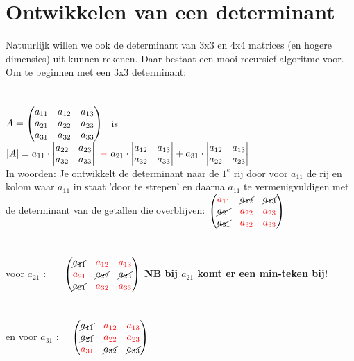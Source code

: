 \section{Ontwikkelen van een determinant}
Natuurlijk willen we ook de determinant van 3x3 en 4x4 matrices (en hogere dimensies) uit kunnen rekenen. Daar bestaat een mooi recursief algoritme voor. Om te beginnen met een 3x3 determinant:\\ \\ \\
{ $  A  = \begin{pmatrix}  a_{11} & a_{12} & a_{13}  \\  a_{21} & a_{22} & a_{23}  \\  a_{31} & a_{32}& a_{33}  \end{pmatrix}  $
	\  is \  
	$ |A|  = a_{11} \cdot   \begin{vmatrix} a_{22} & a_{23} \\ a_{32}& a_{33}  \end{vmatrix} 
	\  {\color{red}-} \ a_{21} \cdot    \begin{vmatrix} a_{12} & a_{13} \\ a_{32}& a_{33}  \end{vmatrix} 
	+a_{31} \cdot    \begin{vmatrix} a_{12} & a_{13} \\  a_{22} & a_{23}  \end{vmatrix}  $ } \\
In woorden: Je ontwikkelt de determinant naar de $ 1^{e} $ rij door voor $  a_{11} $ de rij en kolom waar $  a_{11} $ in staat 'door te strepen' en daarna $  a_{11}  $ te vermenigvuldigen met de determinant van de getallen die overblijven:
$  \begin{pmatrix}   {\color{red}a_{11}} & \cancel{a_{12}} & \cancel{a_{13} }  \\  \cancel{a_{21}} & {\color{red}a_{22}} & {\color{red}a_{23}}  \\  \cancel{a_{31}} & {\color{red}a_{32}} & {\color{red}a_{33}}  \end{pmatrix}  $ \\ \\ \\
voor  $  a_{21}  $ :
\qquad \qquad \quad \ \ \ $  \begin{pmatrix}  \cancel{ a_{11}} & {\color{red}a_{12}} & {\color{red}a_{13 }}  \\ {\color{red}a_{21}} & \cancel{a_{22}} & \cancel{a_{23}}  \\  \cancel{a_{31}} & {\color{red}a_{32}}  & {\color{red}a_{33} } \end{pmatrix}   $
\quad \textbf{NB bij $  a_{21}  $ komt er een min-teken bij!}\\ \\ \\
en voor   $  a_{31} $  :
\qquad \qquad \  \ $   \begin{pmatrix}  \cancel{ a_{11}} & {\color{red}a_{12}} & {\color{red}a_{13}}   \\  \cancel{a_{21}} & {\color{red}a_{22}} & {\color{red}a_{23}}  \\  {\color{red}a_{31}} & \cancel{a_{32}} & \cancel{a_{33} }  \end{pmatrix}  $
\\ \\
